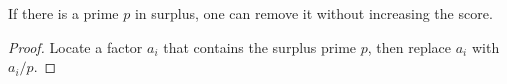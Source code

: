 \begin{sublemma}
\label{score-lower-1}
\leanok
If there is a prime $p$ in surplus, one can remove it without increasing the
  score.
\end{sublemma}
\begin{proof}
\leanok
Locate a factor $a_i$ that contains the surplus prime $p$, then
  replace $a_i$ with $a_i/p$.
\end{proof}
